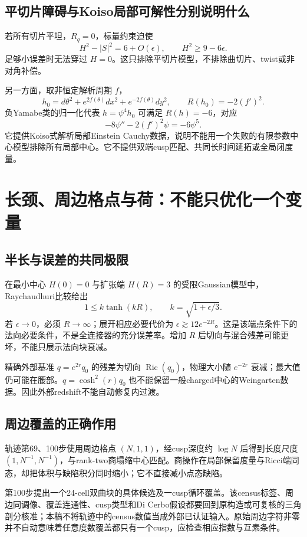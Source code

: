 \documentclass[UTF8,a4paper,11pt,fontset=fandol]{ctexart}
\numberwithin{equation}{section}
\theoremstyle{definition}
\newcommand{\Ric}{\operatorname{Ric}}
\begin{document}
\subsection{平切片障碍与Koiso局部可解性分别说明什么}
若所有切片平坦，$R_q=0$，标量约束迫使
\[
H^2-|S|^2=6+O(\epsilon),\qquad
H^2\ge9-6\epsilon.
\]
足够小误差时无法穿过 $H=0$。这只排除平切片模型，不排除曲切片、twist或非对角补偿。

另一方面，取非恒定解析周期 $f$，
\[
h_0=d\theta^2+e^{2f(\theta)}dx^2+e^{-2f(\theta)}dy^2,
\qquad R(h_0)=-2(f')^2.
\]
负Yamabe类的归一化代表 $h=\psi^4h_0$ 可满足 $R(h)=-6$，对应
\[
-8\psi''-2(f')^2\psi=-6\psi^5.
\]
它提供Koiso式解析局部Einstein Cauchy数据，说明不能用一个失败的有限参数中心模型排除所有局部中心。它不提供双端cusp匹配、共同长时间延拓或全局闭度量。

\section{长颈、周边格点与荷：不能只优化一个变量}
\subsection{半长与误差的共同极限}
在最小中心 $H(0)=0$ 与扩张端 $H(R)=3$ 的受限Gaussian模型中，Raychaudhuri比较给出
\[
1\le k\tanh(kR),\qquad k=\sqrt{1+\epsilon/3}.
\]
若 $\epsilon\to0$，必须 $R\to\infty$；展开相应必要代价为 $\epsilon\gtrsim12e^{-2R}$。这是该端点条件下的法向必要条件，不是全连接器的充分误差率。增加 $R$ 后切向与混合残差可能更坏，不能只展示法向块衰减。

精确外部基准 $q=e^{2r}q_0$ 的残差为切向 $\Ric(q_0)$，物理大小随 $e^{-2r}$ 衰减；最大值仍可能在腰部。$q=\cosh^2(r)q_0$ 也不能保留一般charged中心的Weingarten数据。因此外部redshift不能自动修复内过渡。

\subsection{周边覆盖的正确作用}
轨迹第69、100步使用周边格点 $(N,1,1)$，经cusp深度约 $\log N$ 后得到长度尺度 $(1,N^{-1},N^{-1})$，与rank-two商塌缩中心匹配。商操作在局部保留度量与Ricci端同态，却把体积与缺陷积分同时缩小；它不直接减小点态缺陷。

第100步提出一个24-cell双曲块的具体候选及一cusp循环覆盖。该census标签、周边同调像、覆盖连通性、cusp类型和Di Cerbo假设都要回到原构造或可复核的三角剖分核准；本稿不将轨迹中的census数值当成外部已认证输入。原始周边字符非零并不自动意味着任意度数覆盖都只有一个cusp，应检查相应指数与互素条件。
\end{document}
